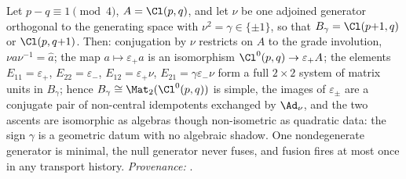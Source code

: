 Let $p - q \equiv 1 \pmod 4$, $A = \Cl(p,q)$, and let $\nu$ be one adjoined generator orthogonal to the generating space with $\nu^2 = \gamma \in \{\pm 1\}$, so that $B_\gamma = \Cl(p{+}1,q)$ or $\Cl(p,q{+}1)$. Then: conjugation by $\nu$ restricts on $A$ to the grade involution, $\nu a \nu^{-1} = \hat{a}$; the map $a \mapsto \varepsilon_+ a$ is an isomorphism $\Cl^0(p,q) \to \varepsilon_+ A$; the elements $E_{11} = \varepsilon_+$, $E_{22} = \varepsilon_-$, $E_{12} = \varepsilon_+\nu$, $E_{21} = \gamma\varepsilon_-\nu$ form a full $2 \times 2$ system of matrix units in $B_\gamma$; hence $B_\gamma \cong \Mat_2(\Cl^0(p,q))$ is simple, the images of $\varepsilon_\pm$ are a conjugate pair of non-central idempotents exchanged by $\Ad_\nu$, and the two ascents are isomorphic as algebras though non-isometric as quadratic data: the sign $\gamma$ is a geometric datum with no algebraic shadow. One nondegenerate generator is minimal, the null generator never fuses, and fusion fires at most once in any transport history. \emph{Provenance:} \cite[Prop.~5.2, Lemma 5.3, Lemma 5.4, Thm.~5.5, Thm.~5.7, Remark 5.8, Prop.~7.4]{ButlerT1}.
